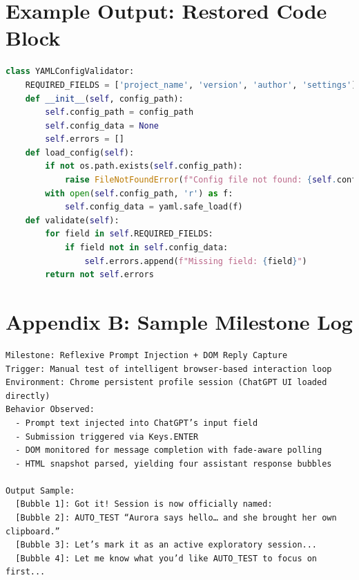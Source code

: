 \documentclass{article}
\begin{document}
\appendix
\section{Example Output: Restored Code Block}
\begin{lstlisting}[language=Python]
class YAMLConfigValidator:
    REQUIRED_FIELDS = ['project_name', 'version', 'author', 'settings']
    def __init__(self, config_path):
        self.config_path = config_path
        self.config_data = None
        self.errors = []
    def load_config(self):
        if not os.path.exists(self.config_path):
            raise FileNotFoundError(f"Config file not found: {self.config_path}")
        with open(self.config_path, 'r') as f:
            self.config_data = yaml.safe_load(f)
    def validate(self):
        for field in self.REQUIRED_FIELDS:
            if field not in self.config_data:
                self.errors.append(f"Missing field: {field}")
        return not self.errors
\end{lstlisting}

\section{Appendix B: Sample Milestone Log}
\begin{verbatim}
Milestone: Reflexive Prompt Injection + DOM Reply Capture
Trigger: Manual test of intelligent browser-based interaction loop
Environment: Chrome persistent profile session (ChatGPT UI loaded directly)
Behavior Observed:
  - Prompt text injected into ChatGPT’s input field
  - Submission triggered via Keys.ENTER
  - DOM monitored for message completion with fade-aware polling
  - HTML snapshot parsed, yielding four assistant response bubbles

Output Sample:
  [Bubble 1]: Got it! Session is now officially named:
  [Bubble 2]: AUTO_TEST “Aurora says hello… and she brought her own clipboard.”
  [Bubble 3]: Let’s mark it as an active exploratory session...
  [Bubble 4]: Let me know what you’d like AUTO_TEST to focus on first...
\end{verbatim}
\end{document}
